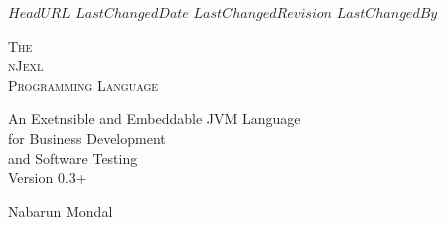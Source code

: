 \svnidlong
{$HeadURL$}
{$LastChangedDate$}
{$LastChangedRevision$}
{$LastChangedBy$}

\thispagestyle{titlepage}

\begin{center}
  \newlength{\parSepLength}
  \setlength{\parSepLength}{10ex}

  \Large
  \centering

  \thinRule\par
  \par\vspace{0.15\parSepLength}
  \begin{minipage}{\textwidth}
    \centering
    \fontsize{36pt}{20pt}\selectfont\titleColor\scshape
    The \\ nJexl \\ Programming Language  
  \end{minipage}
  \par\vspace{0.25\parSepLength}
  \par\thinRule

  \vspace{0.125\parSepLength}

  \begin{minipage}{\textwidth}
    \centering
    An Exetnsible and Embeddable JVM Language \\ for Business Development \\ and Software Testing \\
    Version 0.3+
  \end{minipage}

  \vfill

  \begin{minipage}{\textwidth}
    \centering
    \Large
    Nabarun Mondal
  \end{minipage}

  \vfill

  \begin{minipage}{0.8\textwidth}
    \centering
    \small
  \end{minipage}
\end{center}
